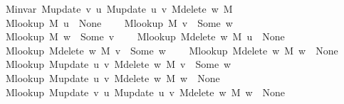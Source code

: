 \begin{isabellebody}
\ \ \ \ {\isachardoublequoteopen}M{\isachardot}{\kern0pt}invar\ {\isacharparenleft}{\kern0pt}M{\isacharunderscore}{\kern0pt}update\ v\ u\ {\isacharparenleft}{\kern0pt}M{\isacharunderscore}{\kern0pt}update\ u\ v\ {\isacharparenleft}{\kern0pt}M{\isacharunderscore}{\kern0pt}delete\ w\ M{\isacharparenright}{\kern0pt}{\isacharparenright}{\kern0pt}{\isacharparenright}{\kern0pt}{\isachardoublequoteclose}\isanewline
\ \ \ \ {\isachardoublequoteopen}M{\isacharunderscore}{\kern0pt}lookup\ M\ u\ {\isacharequal}{\kern0pt}\ None{\isachardoublequoteclose}\isanewline
\ \ \ \ {\isachardoublequoteopen}M{\isacharunderscore}{\kern0pt}lookup\ M\ v\ {\isacharequal}{\kern0pt}\ Some\ w{\isachardoublequoteclose}\isanewline
\ \ \ \ {\isachardoublequoteopen}M{\isacharunderscore}{\kern0pt}lookup\ M\ w\ {\isacharequal}{\kern0pt}\ Some\ v{\isachardoublequoteclose}\isanewline
\ \ \ \ {\isachardoublequoteopen}M{\isacharunderscore}{\kern0pt}lookup\ {\isacharparenleft}{\kern0pt}M{\isacharunderscore}{\kern0pt}delete\ w\ M{\isacharparenright}{\kern0pt}\ u\ {\isacharequal}{\kern0pt}\ None{\isachardoublequoteclose}\isanewline
\ \ \ \ {\isachardoublequoteopen}M{\isacharunderscore}{\kern0pt}lookup\ {\isacharparenleft}{\kern0pt}M{\isacharunderscore}{\kern0pt}delete\ w\ M{\isacharparenright}{\kern0pt}\ v\ {\isacharequal}{\kern0pt}\ Some\ w{\isachardoublequoteclose}\isanewline
\ \ \ \ {\isachardoublequoteopen}M{\isacharunderscore}{\kern0pt}lookup\ {\isacharparenleft}{\kern0pt}M{\isacharunderscore}{\kern0pt}delete\ w\ M{\isacharparenright}{\kern0pt}\ w\ {\isacharequal}{\kern0pt}\ None{\isachardoublequoteclose}\isanewline
\ \ \ \ {\isachardoublequoteopen}M{\isacharunderscore}{\kern0pt}lookup\ {\isacharparenleft}{\kern0pt}M{\isacharunderscore}{\kern0pt}update\ u\ v\ {\isacharparenleft}{\kern0pt}M{\isacharunderscore}{\kern0pt}delete\ w\ M{\isacharparenright}{\kern0pt}{\isacharparenright}{\kern0pt}\ v\ {\isacharequal}{\kern0pt}\ Some\ w{\isachardoublequoteclose}\isanewline
\ \ \ \ {\isachardoublequoteopen}M{\isacharunderscore}{\kern0pt}lookup\ {\isacharparenleft}{\kern0pt}M{\isacharunderscore}{\kern0pt}update\ u\ v\ {\isacharparenleft}{\kern0pt}M{\isacharunderscore}{\kern0pt}delete\ w\ M{\isacharparenright}{\kern0pt}{\isacharparenright}{\kern0pt}\ w\ {\isacharequal}{\kern0pt}\ None{\isachardoublequoteclose}\isanewline
\ \ \ \ {\isachardoublequoteopen}M{\isacharunderscore}{\kern0pt}lookup\ {\isacharparenleft}{\kern0pt}M{\isacharunderscore}{\kern0pt}update\ v\ u\ {\isacharparenleft}{\kern0pt}M{\isacharunderscore}{\kern0pt}update\ u\ v\ {\isacharparenleft}{\kern0pt}M{\isacharunderscore}{\kern0pt}delete\ w\ M{\isacharparenright}{\kern0pt}{\isacharparenright}{\kern0pt}{\isacharparenright}{\kern0pt}\ w\ {\isacharequal}{\kern0pt}\ None{\isachardoublequoteclose}%

\end{isabellebody}

